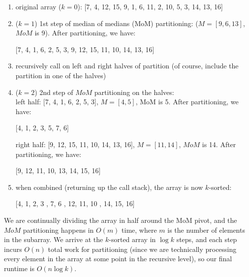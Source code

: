 \documentclass[12pt]{article}
\begin{document}
\begin{enumerate}
\begin{enumerate}
        \begin{enumerate}
            \item original array ($k = 0$): [7, 4, 12, 15, 9, 1, 6, 11, 2, 10, 5, 3, 14, 13, 16]
            \item ($k = 1$) 1st step of median of medians (MoM) partitioning: ($M = [9, 6, 13]$, $MoM$ is 9). After 
            partitioning, we have:
            
            \begin{center}
                [7, 4, 1, 6, 2, 5, 3, 9, 12, 15, 11, 10, 14, 13, 16]
            \end{center}

            \item recursively call on left and right halves of partition (of course, include the partition in one of the halves)
            \item ($k = 2$) 2nd step of $MoM$ partitioning on the halves:\\
            
            left half: [7, 4, 1, 6, 2, 5, 3], $M = [4, 5]$, MoM is 5. After partitioning, we have:\\

            \begin{center}
                [4, 1, 2, 3, 5, 7, 6]
            \end{center}
            
            right half: [9, 12, 15, 11, 10, 14, 13, 16], $M = [11, 14]$, $MoM$ is 14. After partitioning, we have:

            \begin{center}
                [9, 12, 11, 10, 13, 14, 15, 16]
            \end{center}

            \item when combined (returning up the call stack), the array is now $k$-sorted:
            
            \begin{center}
                [4, 1, 2, 3 , 7, 6 , 12, 11, 10 , 14, 15, 16]
            \end{center}

        \end{enumerate}

        We are continually dividing the array in half around the MoM pivot, and the $MoM$ partitioning happens in $O(m)$ 
        time, where $m$ is the number of elements in the subarray. We arrive at the $k$-sorted array in $\log k$ steps, 
        and each step incurs $O(n)$ total work for partitioning (since we are technically processing every element in the 
        array at some point in the recursive level), so our final runtime is $O(n\log k)$.


\end{enumerate}
\end{enumerate}
\end{document}
